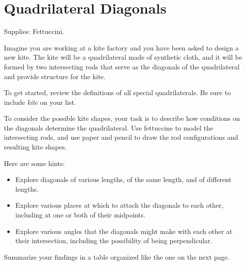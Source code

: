 \newpage

\section{Quadrilateral Diagonals}
\begin{teachingnote}
Supplies:  Fettuccini.
\end{teachingnote}

Imagine you are working at a kite factory and you have been asked to design a new kite.  The kite will be a quadrilateral made of synthetic cloth, and it will be formed by two intersecting rods that serve as the diagonals of the quadrilateral and provide structure for the kite.  

\begin{prob}
To get started, review the definitions of all special quadrilaterals.  Be sure to include \emph{kite} on your list.  
\end{prob}

\begin{prob}
To consider the possible kite shapes, your task is to describe how conditions on the diagonals determine the quadrilateral.  Use fettuccine to model the intersecting rods, and use paper and pencil to draw the rod configurations and resulting kite shapes.  

Here are some hints:  

\begin{itemize}
\item Explore diagonals of various lengths, of the same length, and of different lengths.  
\item Explore various places at which to attach the diagonals to each other, including at one or both of their midpoints.  
\item Explore various angles that the diagonals might make with each other at their intersection, including the possibility of being perpendicular.  
\end{itemize}
\end{prob}

\begin{prob}
Summarize your findings in a table organized like the one on the next page.  
\end{prob}

\newpage 

